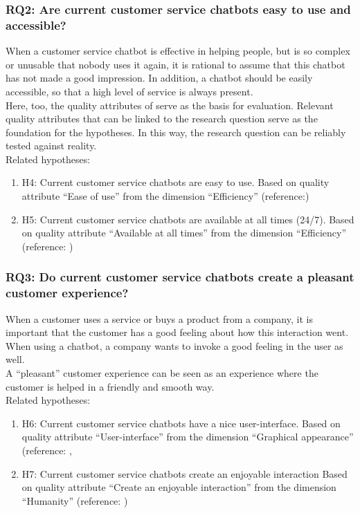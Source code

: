 \subsubsection{RQ2: Are current customer service chatbots easy to use and accessible?}
When a customer service chatbot is effective in helping people, but is so complex or unusable that nobody uses it again, it is rational to assume that this chatbot has not made a good impression. In addition, a chatbot should be easily accessible, so that a high level of service is always present.\\
Here, too, the quality attributes of \citep{Verkeyn2018} serve as the basis for evaluation. Relevant quality attributes that can be linked to the research question serve as the foundation for the hypotheses. In this way, the research question can be reliably tested against reality.\\
\break
\break
Related hypotheses:
\begin{enumerate}
	\item H4: Current customer service chatbots are easy to use. Based on \citep{Verkeyn2018} quality attribute “Ease of use” from the dimension “Efficiency” (reference:\citep*{Candela2018, Duijst2017})
	\item H5: Current customer service chatbots are available at all times (24/7). Based on \citep{Verkeyn2018} quality attribute “Available at all times” from the dimension “Efficiency” (reference: \citep{Wang2019})
\end{enumerate}

\subsubsection{RQ3: Do current customer service chatbots create a pleasant customer experience?}
When a customer uses a service or buys a product from a company, it is important that the customer has a good feeling about how this interaction went. When using a chatbot, a company wants to invoke a good feeling in the user as well. \\
\break
A “pleasant” customer experience can be seen as an experience where the customer is helped in a friendly and smooth way.\\
\break
\break
Related hypotheses:
\begin{enumerate}
	\item H6: Current customer service chatbots have a nice user-interface. Based on \citep{Verkeyn2018} quality attribute “User-interface” from the dimension “Graphical appearance” (reference: \citep*{Duijst2017, Kuligowska2015},
	\item H7: Current customer service chatbots create an enjoyable interaction Based on \citep{Verkeyn2018} quality attribute “Create an enjoyable interaction” from the dimension “Humanity” (reference: \citep{Morrissey2013})
\end{enumerate}

